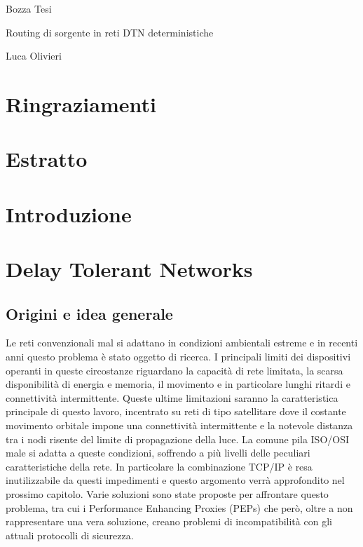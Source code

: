\documentclass[12pt,a4paper,oneside]{book}
\begin{document}
	
	\centerline{\sc Bozza Tesi}
	\centerline{\sc \large Routing di sorgente in reti DTN deterministiche}
	\centerline{\sc Luca Olivieri}
	\vspace{2pc}
	
	\clearpage
	
	\chapter*{Ringraziamenti}	
	
	\clearpage
	
	\chapter*{Estratto}
	
	\clearpage
	
	\tableofcontents
	
	\clearpage
	
	\chapter{Introduzione}
	
	\clearpage
	
	\chapter{Delay Tolerant Networks}
		
		\section{Origini e idea generale}
		
		Le reti convenzionali mal si adattano in condizioni ambientali estreme e in recenti anni questo problema è stato oggetto di ricerca. I principali limiti dei dispositivi operanti in queste circostanze riguardano la capacità di rete limitata, la scarsa disponibilità di energia e memoria, il movimento e in particolare lunghi ritardi e connettività intermittente. Queste ultime limitazioni saranno la caratteristica principale di questo lavoro, incentrato su reti di tipo satellitare dove il costante movimento orbitale impone una connettività intermittente e la notevole distanza tra i nodi risente del limite di propagazione della luce. La comune pila ISO/OSI male si adatta a queste condizioni, soffrendo a più livelli delle peculiari caratteristiche della rete. In particolare la combinazione TCP/IP è resa inutilizzabile da questi impedimenti e questo argomento verrà approfondito nel prossimo capitolo. Varie soluzioni sono state proposte per affrontare questo problema, tra cui i Performance Enhancing Proxies (PEPs) che però, oltre a non rappresentare una vera soluzione, creano problemi di incompatibilità con gli attuali protocolli di sicurezza.
		
\end{document}
